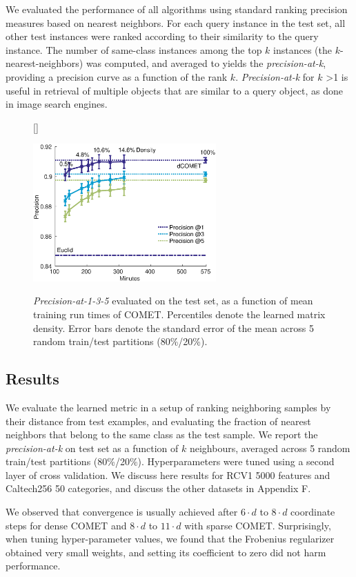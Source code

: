 \documentclass[twoside,11pt]{article}
\newcommand\mat[1]{{#1}}
\newcommand{\ignore}[1]{}
\newcommand{\Vk}{\mat{V_k}}
\newcommand{\Vgrc}{\{\Vk\}_{k=1}^{d}} %
\begin{document}
We evaluated the performance of all algorithms using standard ranking precision measures based on nearest neighbors. For each query instance in the test set, all other test instances were ranked according to their similarity to the query instance. The number of same-class instances
among the top $k$ instances (the $k$-nearest-neighbors) was computed, and averaged to  yields the \textit{precision-at-k},
providing a precision curve as a function of the rank $k$. \textit{Precision-at-k} for $k$ >1 is useful in retrieval of multiple objects that are similar to a query object, as done in image search engines.
\begin{figure}
\captionsetup{font=small}
[\FBwidth]
{\caption{\textit{Precision-at-1-3-5} evaluated on the test set, as a function of mean training run times of COMET. Percentiles denote the learned matrix density. Error bars denote the standard error of the mean across 5 random train/test partitions (80\%/20\%).}\label{spCometPrecTime}}
{\includegraphics[width=7cm]{sCOMET_precision_vs_runtime}}
\vskip 9pt
\end{figure}

\vspace{-6pt}
\subsection{Results}\vskip -5pt
We evaluate the learned metric in a setup of ranking neighboring samples by their distance from test examples, and evaluating the fraction of nearest neighbors that belong to the same class as the test sample. We report the \textit{precision-at-k} on test set as a function of $k$ neighbours, averaged across 5 random train/test partitions (80\%/20\%). Hyperparameters were tuned using a second layer of cross validation. We discuss here results for RCV1 5000 features and Caltech256 50 categories, and discuss the other datasets in Appendix F.
\ignore{Figure \ref{cometConvergeFig} shows the \textit{precision-at-k} over the test sets as it progresses during learning. 
}
We observed that convergence is usually achieved after $6 \cdot d$ to $8 \cdot d$ coordinate steps for dense COMET and $8 \cdot d$ to $11 \cdot d$ with sparse COMET.
Surprisingly, when tuning hyper-parameter values, we found that the Frobenius regularizer obtained very small weights, and setting its coefficient to zero did not harm performance. 
\end{document}
